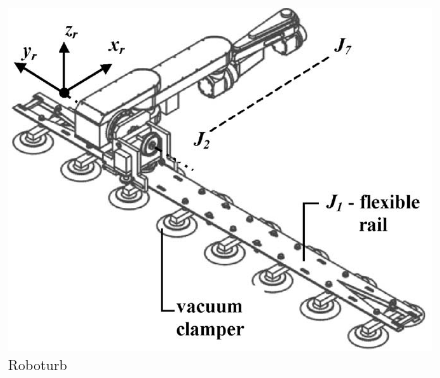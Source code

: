 
\begin{figure}[h!]
    \centering
    \includegraphics[scale=0.2]{figs/trilhos/roboturbpaper}
    \caption{Roboturb}
\end{figure}%


